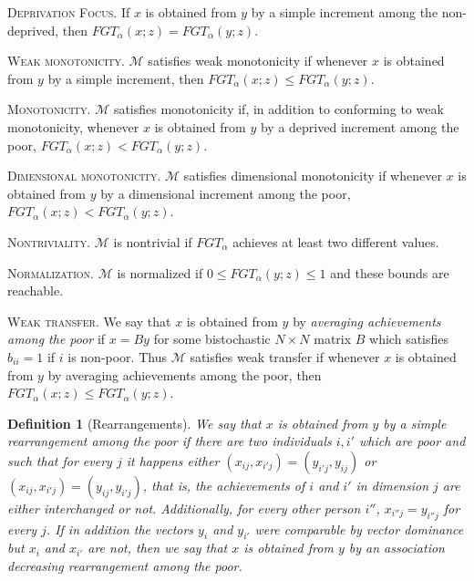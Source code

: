 \documentclass[english, a4paper,12pt]{article}
\newtheorem*{defn*}{Definition}
\begin{document}
	\vspace{2ex}
		\textsc{Deprivation Focus.} If $x$ is obtained from $y$ by a simple increment among the non-deprived, then $FGT_{\alpha}(x ; z) = FGT_{\alpha}(y; z)$.

	\vspace{2ex}
		\textsc{Weak monotonicity.} $\mathcal{M}$ satisfies weak monotonicity if whenever $x$ is obtained from $y$ by a simple increment, then $FGT_{\alpha}(x; z) \leq FGT_{\alpha}(y;z)$.

	\vspace{2ex}
		\textsc{Monotonicity.} $\mathcal{M}$ satisfies monotonicity if, in addition to conforming to weak monotonicity, whenever $x$ is obtained from $y$ by a deprived increment among the poor, $FGT_{\alpha}(x;z) < FGT_{\alpha}(y;z)$.

	\vspace{2ex}
		\textsc{Dimensional monotonicity.} $\mathcal{M}$ satisfies dimensional monotonicity if whenever $x$ is obtained from $y$ by a dimensional increment among the poor, $FGT_{\alpha}(x; z) < FGT_{\alpha}(y;z)$.

	\vspace{2ex}
		\textsc{Nontriviality.} $\mathcal{M}$ is nontrivial if $FGT_{\alpha}$ achieves at least two different values.

	\vspace{2ex}
		\textsc{Normalization.} $\mathcal{M}$ is normalized if $0 \leq FGT_{\alpha}(y;z) \leq 1$ and these bounds are reachable.

	\vspace{2ex}
		\textsc{Weak transfer.} We say that $x$ is obtained from $y$ by \textit{averaging achievements among the poor} if $x = By$ for some bistochastic $N \times N$ matrix $B$ which satisfies $b_{ii} = 1$ if $i$ is non-poor. Thus $\mathcal{M}$ satisfies weak transfer if whenever $x$ is obtained from $y$ by averaging achievements among the poor, then $FGT_{\alpha}(x; z) \leq FGT_{\alpha}(y;z)$.

\begin{defn*}[Rearrangements] We say that $x$ is obtained from $y$ by a \textit{simple rearrangement among the poor} if there are two individuals $i, i'$ which are poor and such that for every $j$ it happens either $(x_{ij}, x_{i'j}) = (y_{i'j}, y_{ij})$ or $(x_{ij}, x_{i'j}) = (y_{ij}, y_{i'j})$, that is, the achievements of $i$ and $i'$ in dimension $j$ are either interchanged or not. Additionally, for every other person $i''$, $x_{i''j} = y_{i''j}$ for every $j$. If in addition the vectors $y_{i}$ and $y_{i'}$ were comparable by vector dominance but $x_{i}$ and $x_{i'}$ are not, then we say that $x$ is obtained from $y$ by an \textit{association decreasing rearrangement among the poor}. 
\end{defn*}
		
\end{document}
